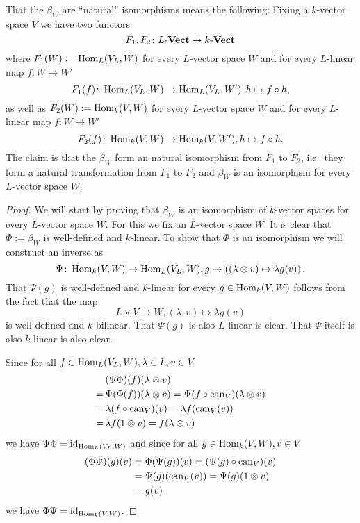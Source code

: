 That the $\beta_W$ are ``natural'' isomorphisms means the following: Fixing a $k$-vector space $V$ we have two functors
\[
 F_1, F_2 \colon L\text{-}\mathbf{Vect} \to k\text{-}\mathbf{Vect}
\]
where $F_1(W) := \operatorname{Hom}_L(V_L,W)$ for every $L$-vector space $W$ and for every $L$-linear map $f \colon W \to W'$
\[
 F_1(f) \colon \operatorname{Hom}_L(V_L, W) \to \operatorname{Hom}_L(V_L, W'), h \mapsto f \circ h,
\]
as well as $F_2(W) := \operatorname{Hom}_k(V,W)$ for every $L$-vector space $W$ and for every $L$-linear map $f \colon W \to W'$
\[
 F_2(f) \colon \operatorname{Hom}_k(V,W) \to \operatorname{Hom}_k(V,W'), h \mapsto f \circ h.
\]
The claim is that the $\beta_W$ form an natural isomorphism from $F_1$ to $F_2$, i.e.\ they form a natural transformation from $F_1$ to $F_2$ and $\beta_W$ is an isomorphism for every $L$-vector space $W$.


\begin{proof}
 We will start by proving that $\beta_W$ is an isomorphism of $k$-vector spaces for every $L$-vector space $W$. For this we fix an $L$-vector space $W$. It is clear that $\Phi := \beta_W$ is well-defined and $k$-linear. To show that $\Phi$ is an isomorphism we will construct an inverse as
 \[
  \Psi \colon \operatorname{Hom}_k(V,W) \to \operatorname{Hom}_L(V_L, W), g \mapsto \left( (\lambda \otimes v) \mapsto \lambda g(v) \right).
 \]
 That $\Psi(g)$ is well-defined and $k$-linear for every $g \in \operatorname{Hom}_k(V,W)$ follows from the fact that the map
 \[
  L \times V \to W, (\lambda, v) \mapsto \lambda g(v)
 \]
 is well-defined and $k$-bilinear. That $\Psi(g)$ is also $L$-linear is clear. That $\Psi$ itself is also $k$-linear is also clear.
 
 Since for all $f \in \operatorname{Hom}_L(V_L,W), \lambda \in L, v \in V$
 \begin{align*}
   &\,(\Psi \Phi)(f)(\lambda \otimes v) \\
  =&\,\Psi(\Phi(f))(\lambda \otimes v)
  =   \Psi(f \circ \operatorname{can}_V)(\lambda \otimes v) \\
  =&\,\lambda (f \circ \operatorname{can}_V)(v)
  =   \lambda f(\operatorname{can}_V(v)) \\
  =&\,\lambda f(1 \otimes v)
  =   f (\lambda \otimes v)
 \end{align*}
 we have $\Psi \Phi = \operatorname{id}_{\operatorname{Hom}_L(V_L, W)}$ and since for all $g \in \operatorname{Hom}_k(V,W), v \in V$
 \begin{align*}
  (\Phi \Psi)(g)(v)
  &= \Phi(\Psi(g))(v)
  = (\Psi(g) \circ \operatorname{can}_V)(v) \\
  &= \Psi(g)(\operatorname{can}_V(v))
  = \Psi(g)(1 \otimes v) \\
  &= g(v)
 \end{align*}
 we have $\Phi \Psi = \operatorname{id}_{\operatorname{Hom}_k(V,W)}$.
 

\end{proof}
